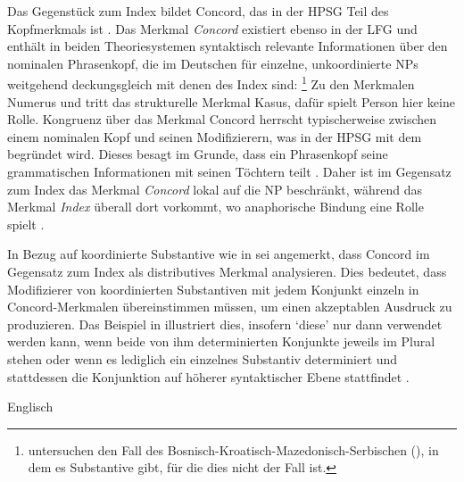 \label{phsec:concord}
Das Gegenstück zum Index bildet Concord, das in der HPSG Teil des Kopfmerkmals
ist \autocite[17]{wechslerzlatic2003}. Das Merkmal \emph{Concord} existiert
ebenso in der LFG \autocite[189--192]{bresnanetal2016} und enthält in beiden
Theoriesystemen syntaktisch relevante Informationen über den nominalen
Phrasenkopf, die im Deutschen für einzelne, unkoordinierte
NPs weitgehend deckungsgleich mit denen des Index sind:%
%
	\footnote{\citet{wechslerzlatic2003} untersuchen den Fall des
	Bosnisch-Kroatisch-Mazedonisch-Serbischen (), in dem es
	Substantive gibt, für die dies nicht der Fall ist.}
%
Zu den Merkmalen Numerus und  tritt das strukturelle Merkmal Kasus,
dafür spielt Person hier keine Rolle. Kongruenz über das Merkmal Concord
herrscht typischerweise zwischen einem nominalen Kopf und seinen Modifizierern,
was in der HPSG mit dem  begründet wird. Dieses
besagt im Grunde, dass ein Phrasenkopf seine grammatischen Informationen mit
seinen Töchtern teilt
\autocites[vgl.][34]{pollardsag1994}[22]{wechslerzlatic2003}. Daher ist im
Gegensatz zum Index das Merkmal \emph{Concord} lokal auf die NP beschränkt,
während das Merkmal \emph{Index} überall dort vorkommt, wo
anaphorische Bindung eine Rolle spielt
\parencites[14--16, 22]{wechslerzlatic2003}[189]{bresnanetal2016}.

In Bezug auf koordinierte Substantive wie in  sei angemerkt,
dass \citet[76--78]{kingdalrymple2004} Concord im Gegensatz zum Index als
distributives Merkmal analysieren. Dies bedeutet, dass Modifizierer von
koordinierten Substantiven mit jedem Konjunkt einzeln in Concord-Merkmalen
übereinstimmen müssen, um einen akzeptablen Ausdruck zu produzieren. Das
Beispiel in  illustriert dies, insofern 
`diese' nur dann verwendet werden kann, wenn beide von ihm determinierten
Konjunkte jeweils im Plural stehen  oder wenn es
lediglich ein einzelnes Substantiv determiniert und stattdessen die Konjunktion
auf höherer syntaktischer Ebene stattfindet
.

\begin{exe}
\ex\label{ex:engartdiscong}
	\langinfo%
		{Englisch}
		{}
		{\cite[nach][70]{kingdalrymple2004}}
	\begin{xlist}
		\label{ex:engartdiscong_1}
		\label{ex:engartdiscong_2}
		\label{ex:engartdiscong_3}
		\label{ex:engartdiscong_4}
	\end{xlist}
\end{exe}

